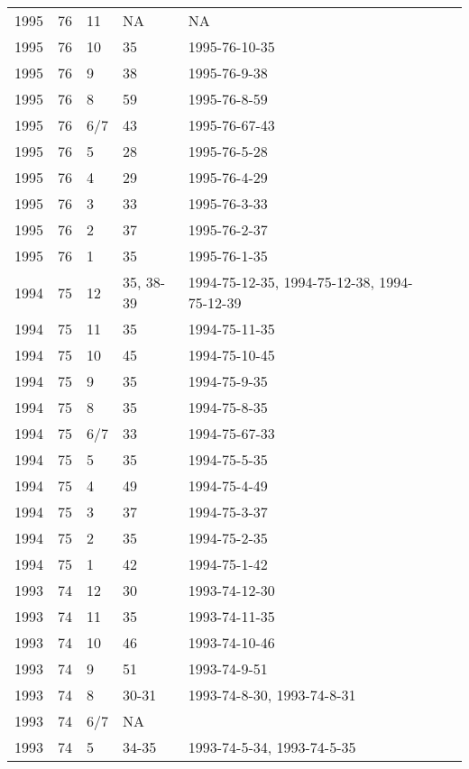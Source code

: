 \begin{longtable}{ |l|l|l|l|p{2.7cm}|l|p{2cm}| }
 1995 & 76 &    11 &    NA   & NA             &  & \\
 1995 & 76 &    10 &    35   & 1995-76-10-35  &  & \\
 1995 & 76 &     9 &     38  &  1995-76-9-38  &  & \\
 1995 & 76 &     8 &     59  & 1995-76-8-59   &  & \\
 1995 & 76 &   6/7 &    43   & 1995-76-67-43  &  & \\
 1995 & 76 &     5 &    28   & 1995-76-5-28   &  & \\
 1995 & 76 &     4 &    29   & 1995-76-4-29   &  & \\
 1995 & 76 &     3 &    33   & 1995-76-3-33   &  & \\
 1995 & 76 &     2 &    37   & 1995-76-2-37   &  & \\
 1995 & 76 &     1 &   35    & 1995-76-1-35   &  & \\
 1994 & 75 &    12 & 35, 38-39 &  1994-75-12-35, 1994-75-12-38, 1994-75-12-39 &  & \\
 1994 & 75 &    11 &   35    &  1994-75-11-35 &  & \\
 1994 & 75 &    10 &    45   &  1994-75-10-45 &  & \\
 1994 & 75 &     9 &   35    &  1994-75-9-35  &  & \\
 1994 & 75 &     8 &   35    &  1994-75-8-35  &  & \\
 1994 & 75 &   6/7 &   33    &  1994-75-67-33 &  & \\
 1994 & 75 &     5 &  35     &  1994-75-5-35  &   & \\
 1994 & 75 &     4 &  49     & 1994-75-4-49   &  & \\
 1994 & 75 &     3 &  37     & 1994-75-3-37   &  & \\
 1994 & 75 &     2 &   35    & 1994-75-2-35   &  & \\
 1994 & 75 &     1 &    42   &  1994-75-1-42  &  & \\
 1993 & 74 &    12 &    30   &  1993-74-12-30 &  & \\
 1993 & 74 &    11 &     35  & 1993-74-11-35  &  & \\
 1993 & 74 &    10 &    46   & 1993-74-10-46  &  & \\
 1993 & 74 &     9 &   51    &  1993-74-9-51  &  & \\
 1993 & 74 &     8 & 30-31   & 1993-74-8-30, 1993-74-8-31&  & \\
 1993 & 74 &   6/7 &   NA    &                &  & \\
 1993 & 74 &     5 &  34-35  & 1993-74-5-34, 1993-74-5-35 &  & \\

\end{longtable}
